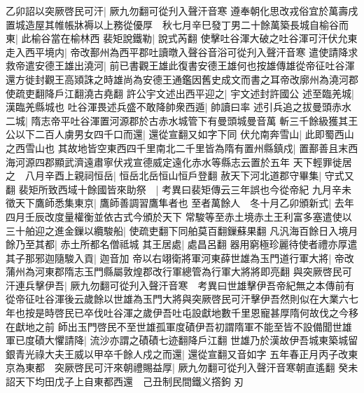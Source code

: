 乙卯詔以突厥啓民可汗|{
	厥九勿翻可從刋入聲汗音寒}
遵奉朝化思改戎俗宜於萬壽戌置城造屋其帷帳牀褥以上務從優厚　秋七月辛巳發丁男二十餘萬築長城自榆谷而東|{
	此榆谷當在榆林西}
裴矩說鐵勒|{
	說式芮翻}
使擊吐谷渾大破之吐谷渾可汗伏允東走入西平境内|{
	帝改鄯州為西平郡吐讀暾入聲谷音浴可從刋入聲汗音寒}
遣使請降求救帝遣安德王雄出澆河|{
	前已書觀王雄此復書安德王雄何也按雄傳雄從帝征吐谷渾還方徙封觀王高熲誅之時雄尚為安德王通鑑因舊史成文而書之耳帝改廓州為澆河郡使疏吏翻降戶江翻澆古堯翻}
許公宇文述出西平迎之|{
	宇文述封許國公}
述至臨羌城|{
	漢臨羌縣城也}
吐谷渾畏述兵盛不敢降帥衆西遁|{
	帥讀曰率}
述引兵追之拔曼頭赤水二城|{
	隋志帝平吐谷渾置河源郡於古赤水城管下有曼頭城曼音萬}
斬三千餘級獲其王公以下二百人虜男女四千口而還|{
	還從宣翻又如字下同}
伏允南奔雪山|{
	此即蜀西山之西雪山也}
其故地皆空東西四千里南北二千里皆為隋有置州縣鎮戍|{
	置鄯善且末西海河源四郡顯武濟遠肅寧伏戎宣德威定遠化赤水等縣志云置於五年}
天下輕罪徙居之　八月辛酉上親祠恒岳|{
	恒岳北岳恒山恒戶登翻}
赦天下河北道郡守畢集|{
	守式又翻}
裴矩所致西域十餘國皆來助祭　|{
	考異曰裴矩傳云三年誤也今從帝紀}
九月辛未徵天下鷹師悉集東京|{
	鷹師善調習鷹隼者也}
至者萬餘人　冬十月乙卯頒新式|{
	去年四月壬辰改度量權衡並依古式今頒於天下}
常駿等至赤土境赤土王利富多塞遣使以三十舶迎之進金鏁以纜駿船|{
	使疏吏翻下同舶莫百翻鏁蘇果翻}
凡汎海百餘日入境月餘乃至其都|{
	赤土所都名僧祗城}
其王居處|{
	處昌呂翻}
器用窮極珍麗待使者禮亦厚遣其子那邪迦隨駿入貢|{
	迦音加}
帝以右翊衛將軍河東薛世雄為玉門道行軍大將|{
	帝改蒲州為河東郡隋志玉門縣屬敦煌郡改行軍總管為行軍大將將即亮翻}
與突厥啓民可汗連兵擊伊吾|{
	厥九勿翻可從刋入聲汗音寒　考異曰世雄擊伊吾帝紀無之本傳前有從帝征吐谷渾後云歲餘以世雄為玉門大將與突厥啓民可汗擊伊吾然則似在大業六七年也按是時啓民已卒伐吐谷渾之歲伊吾吐屯設獻地數千里恩寵甚厚隋何故伐之今移在獻地之前}
師出玉門啓民不至世雄孤軍度磧伊吾初謂隋軍不能至皆不設備聞世雄軍已度磧大懼請降|{
	流沙亦謂之磧磧七迹翻降戶江翻}
世雄乃於漢故伊吾城東築城留銀青光祿大夫王威以甲卒千餘人戍之而還|{
	還從宣翻又音如字}
五年春正月丙子改東京為東都　突厥啓民可汗來朝禮賜益厚|{
	厥九勿翻可從刋入聲汗音寒朝直遙翻}
癸未詔天下均田戊子上自東都西還　己丑制民間鐵义撘鉤刃

